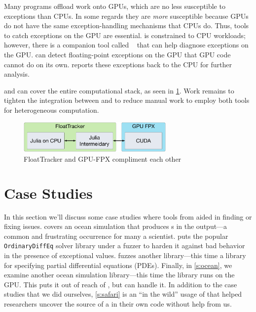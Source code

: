 \documentclass{juliacon}
\begin{document}
Many programs offload work onto GPUs, which are no less susceptible to \fp{} exceptions than CPUs.
In some regards they are \emph{more} susceptible because GPUs do not have the same exception-handling mechanisms that CPUs do.
Thus, tools to catch \fp{} exceptions on the GPU are essential.
\FT{} is constrained to CPU workloads; however, there is a companion tool called \GPUFPX{}~\cite{llsflg-hpdc-2023} that can help diagnose \fp{} exceptions on the GPU.
\GPUFPX{} can detect floating-point exceptions on the GPU that GPU code cannot do on its own.
\GPUFPX{} reports these exceptions back to the CPU for further analysis.

\FT{} and \GPUFPX{} can cover the entire computational stack, as seen in \cref{fig:ft_and_gpu_fpx}.
Work remains to tighten the integration between \FT{} and \GPUFPX{} to reduce manual work to employ both tools for heterogeneous computation.

\begin{figure}[ht]
  \centering
  \includegraphics[width=3in]{./fig/float_tracker_context_boxes.png}
  \caption{FloatTracker and GPU-FPX compliment each other}
  \label{fig:ft_and_gpu_fpx}
\end{figure}

\section{Case Studies}
\label{s:casestudies}

In this section we'll discuss some case studies where tools from \FlowFPX{} aided in finding or fixing \fp{} issues.
 covers an ocean simulation that produces \NaN{}s in the output---a common and frustrating occurrence for many a scientist.  puts the popular \texttt{OrdinaryDiffEq} solver library under a fuzzer to harden it against bad behavior in the presence of exceptional \fp{} values.  fuzzes another library---this time a library for specifying partial differential equations (PDEs). Finally, in \cref{s:ocean}, we examine another ocean simulation library---this time the library runs on the GPU. This puts it out of reach of \FT{}, but \GPUFPX{} can handle it. In addition to the case studies that we did ourselves, \cref{s:safari} is an ``in the wild'' usage of \FT{} that helped researchers uncover the source of a \NaN{} in their own code without help from us.
\end{document}
